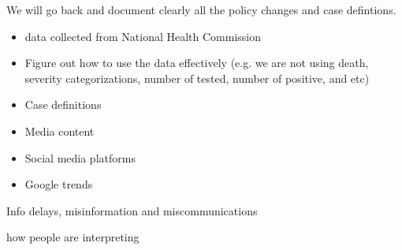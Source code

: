 We will go back and document clearly all the policy changes and case defintions. 

\begin{itemize}
\item{data collected from National Health Commission}
\item{Figure out how to use the data effectively (e.g. we are not using death, severity categorizations, number of tested, number of positive, and etc)}
\item{Case definitions}
\item{Media content}
\item{Social media platforms}
\item{Google trends}
\end{itemize}


Info delays, misinformation and miscommunications


how people are interpreting 


